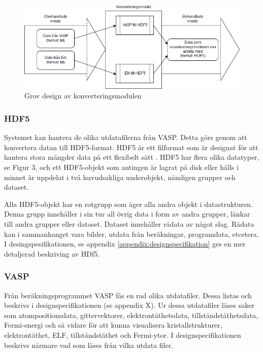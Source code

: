 \documentclass[a4paper,12pt]{article}
\begin{document}
\begin{figure}[H]
	\centering
	\includegraphics[scale=0.55]{konverteringdetalj.png}
	\caption{Grov design av konverteringsmodulen}
	\label{fig:konverteringdetalj}
\end{figure}

\subsubsection{HDF5}
Systemet kan hantera de olika utdatafilerna från VASP.%
Detta görs genom att konvertera datan till HDF5-format.
HDF5 är ett filformat som är designat för att hantera stora mängder data på ett flexibelt sätt \cite{hdf5}.
HDF5 har flera olika datatyper, se Figur 3, och ett HDF5-objekt som antingen är lagrat på disk eller hålls i minnet är uppdelat i två huvudsakliga underobjekt, nämligen grupper och dataset.

Alla HDF5-objekt har en rotgrupp som äger alla andra objekt i datastrukturen. Denna grupp innehåller i sin tur all övrig data i form av andra grupper, länkar till andra grupper eller dataset.
Dataset innehåller rådata av något slag. Rådata kan i sammanhanget vara bilder, utdata från beräkningar, programdata, etcetera. %
I desingspesifikationen, se appendix \ref{appendix:designspecifikation} ges en mer detaljerad beskriving av HDf5.

\subsubsection{VASP}
Från beräkningsprogrammet VASP fås en rad olika utdatafiler. Dessa listas och beskrivs i designspecifikationen %
(se appendix X). Ur dessa utdatafiler läses saker som atompositionsdata, gittervektorer, elektrontäthetsdata, tillståndstäthetsdata, Fermi-energi och så vidare för att kunna visualisera kristallstrukturer, elektrontäthet, ELF, tillståndstäthet och Fermi-ytor. I designspecifikationen %
beskrivs närmare vad som läses från vilka utdata filer. 
\end{document}
